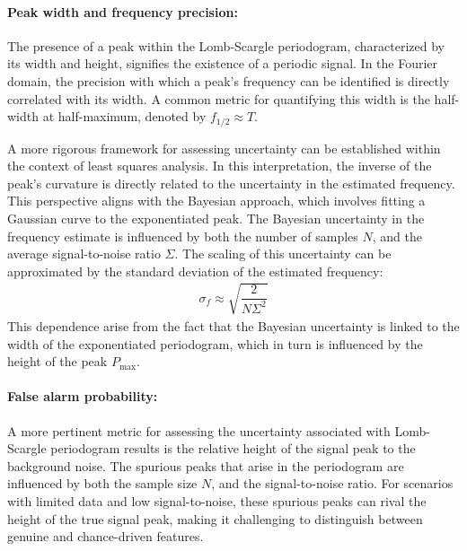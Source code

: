     			\paragraph{Peak width and frequency precision:}
    			The presence of a peak within the Lomb-Scargle periodogram, characterized by its width and height, signifies the existence of a periodic signal. In the Fourier domain, the precision with which a peak's frequency can be identified is directly correlated with its width. A common metric for quantifying this width is the half-width at half-maximum, denoted by $f_{1/2}\approx T$.
    			
    			A more rigorous framework for assessing uncertainty can be established within the context of least squares analysis. In this interpretation, the inverse of the peak's curvature is directly related to the uncertainty in the estimated frequency. This perspective aligns with the Bayesian approach, which involves fitting a Gaussian curve to the exponentiated peak. The Bayesian uncertainty in the frequency estimate is influenced by both the number of samples $N$, and the average signal-to-noise ratio $\Sigma$. The scaling of this uncertainty can be approximated by the standard deviation of the estimated frequency:
    			\begin{align}
    				\sigma_f\approx\sqrt{\dfrac{2}{N\Sigma^2}} \label{eqn:stddev-est-freq}
    			\end{align}
    			This dependence arise from the fact that the Bayesian uncertainty is linked to the width of the exponentiated periodogram, which in turn is influenced by the height of the peak $P_\text{max}$.
    			
    			\paragraph{False alarm probability:}
    			A more pertinent metric for assessing the uncertainty associated with Lomb-Scargle periodogram results is the relative height of the signal peak to the background noise. The spurious peaks that arise in the periodogram are influenced by both the sample size $N$, and the signal-to-noise ratio. For scenarios with limited data and low signal-to-noise, these spurious peaks can rival the height of the true signal peak, making it challenging to distinguish between genuine and chance-driven features.
    			
